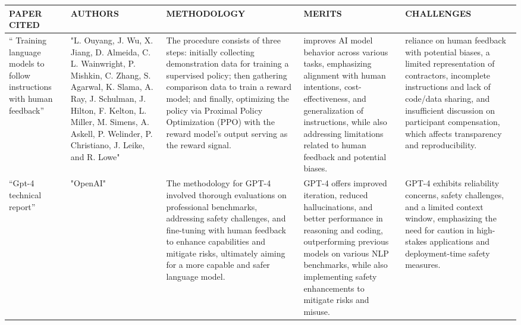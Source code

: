 \documentclass[fleqn,10pt]{thescipub} %
\begin{document}
\begin{table}
\begin{center}
\begin{tabular}{ |p{2cm}|p{2cm}|p{4cm}|p{4cm}|p{3cm}| }
\hline
\end{tabular}
\end{center}
\end{table}

\begin{table}
\begin{center}
 \centering
  \small %
    \begin{tabular}{ |p{2cm}|p{3cm}|p{3.5cm}|p{3.5cm}|p{3.5cm}| }
\hline
\centering PAPER CITED & \centering  AUTHORS & \centering METHODOLOGY &  \centering MERITS &  \centering CHALLENGES \arraybackslash \\ 
\hline
“ Training language models to follow instructions with human feedback” & "L. Ouyang, J. Wu, X. Jiang, D. Almeida, C. L. Wainwright, P. Mishkin, C. Zhang, S. Agarwal, K. Slama, A. Ray, J. Schulman, J. Hilton, F. Kelton, L. Miller, M. Simens, A. Askell, P. Welinder, P. Christiano, J. Leike, and R. Lowe" & The procedure consists of three steps: initially collecting demonstration data for training a supervised policy; then gathering comparison data to train a reward model; and finally, optimizing the policy via Proximal Policy Optimization (PPO) with the reward model's output serving as the reward signal. & improves AI model behavior across various tasks, emphasizing alignment with human intentions, cost-effectiveness, and generalization of instructions, while also addressing limitations related to human feedback and potential biases. & reliance on human feedback with potential biases, a limited representation of contractors, incomplete instructions and lack of code/data sharing, and insufficient discussion on participant compensation, which affects transparency and reproducibility. \\
\hline
“Gpt-4 technical report”& "OpenAI" & The methodology for GPT-4 involved thorough evaluations on professional benchmarks, addressing safety challenges, and fine-tuning with human feedback to enhance capabilities and mitigate risks, ultimately aiming for a more capable and safer language model. & GPT-4 offers improved iteration, reduced hallucinations, and better performance in reasoning and coding, outperforming previous models on various NLP benchmarks, while also implementing safety enhancements to mitigate risks and misuse. & GPT-4 exhibits reliability concerns, safety challenges, and a limited context window, emphasizing the need for caution in high-stakes applications and deployment-time safety measures. \\
\hline
\end{tabular}
\end{center}
\end{table}
\end{document}
